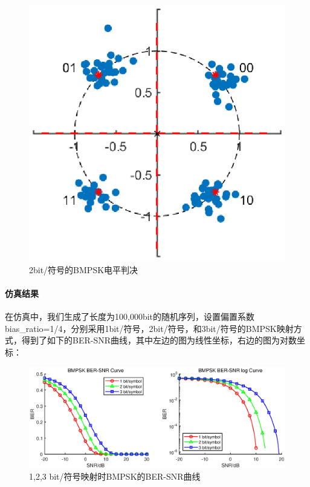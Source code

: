 \begin{figure}[h]
    \centering
    \includegraphics[width=\textwidth]{pic/1-1-4.eps}
    \caption{2bit/符号的BMPSK电平判决}
\end{figure}


\paragraph{仿真结果}
\indent

在仿真中，我们生成了长度为100,000bit的随机序列，设置偏置系数bias\_ratio=1/4，分别采用1bit/符号，2bit/符号，和3bit/符号的BMPSK映射方式，得到了如下的BER-SNR曲线，其中左边的图为线性坐标，右边的图为对数坐标：

\begin{figure}[ht]
    \centering
    \includegraphics[width=\textwidth]{pic/1-1-5.eps}
    \caption{1,2,3 bit/符号映射时BMPSK的BER-SNR曲线}
\end{figure}

